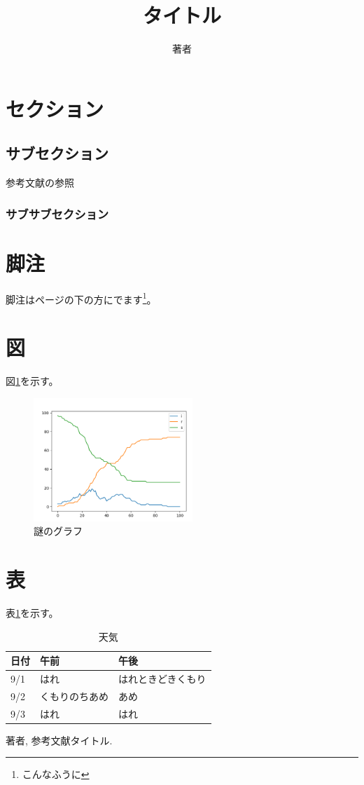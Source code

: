 \documentclass[uplatex,twocolumn]{jsarticle}
\title{タイトル}
\author{著者}
\date{\parbox{.8\textwidth}{
  \noindent\hfil{\bfseries\abstractname}\hfil\\\indent
  ここに概要を書く。この文書は研究室内シンポジウムのための雛形文書です。と
  か。
}}
\begin{document}
\maketitle
\thispagestyle{empty}

\section{セクション}

\subsection{サブセクション}
参考文献の参照\cite{bunken1}
\subsubsection{サブサブセクション}
\section{脚注}
脚注はページの下の方にでます\footnote{こんなふうに}。


\section{図}
図\ref{aco}を示す。\\

\begin{figure}[htbp]
 \begin{center}
  \includegraphics[width=6cm]{fig1.png}
 \end{center}
 \caption{謎のグラフ}
 \label{aco}
\end{figure}

\section{表}

表\ref{tenki}を示す。

\begin{table}[htbp]
\begin{center}
 \caption{天気}
 \label{tenki}
 \begin{tabular}{|l|p{}|p{}|}\hline
  日付 & 午前           & 午後               \\ \hline
  9/1  & はれ           & はれときどきくもり \\ 
  9/2  & くもりのちあめ & あめ               \\ 
  9/3  & はれ           & はれ               \\ \hline
 \end{tabular}
 \end{center}
\end{table}


\begin{thebibliography}{99}
  著者, 参考文献タイトル.
\end{thebibliography}
\end{document}

